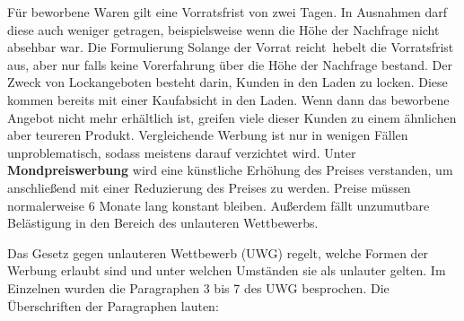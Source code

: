 Für beworbene Waren gilt eine Vorratsfrist von zwei Tagen. In Ausnahmen darf diese auch weniger getragen, beispielsweise wenn die Höhe der Nachfrage nicht absehbar war. Die Formulierung \ql Solange der Vorrat reicht\qr\ hebelt die Vorratsfrist aus, aber nur falls keine Vorerfahrung über die Höhe der Nachfrage bestand. Der Zweck von Lockangeboten besteht darin, Kunden in den Laden zu locken. Diese kommen bereits mit einer Kaufabsicht in den Laden. Wenn dann das beworbene Angebot nicht mehr erhältlich ist, greifen viele dieser Kunden zu einem ähnlichen aber teureren Produkt. Vergleichende Werbung ist nur in wenigen Fällen unproblematisch, sodass meistens darauf verzichtet wird. Unter {\bf Mondpreiswerbung} wird eine künstliche Erhöhung des Preises verstanden, um anschließend mit einer Reduzierung des Preises zu werden. Preise müssen normalerweise 6 Monate lang konstant bleiben. Außerdem fällt unzumutbare Belästigung in den Bereich des unlauteren Wettbewerbs.

Das Gesetz gegen unlauteren Wettbewerb (UWG) regelt, welche Formen der Werbung erlaubt sind und unter welchen Umständen sie als unlauter gelten. Im Einzelnen wurden die Paragraphen 3 bis 7 des UWG besprochen. Die Überschriften der Paragraphen lauten:

